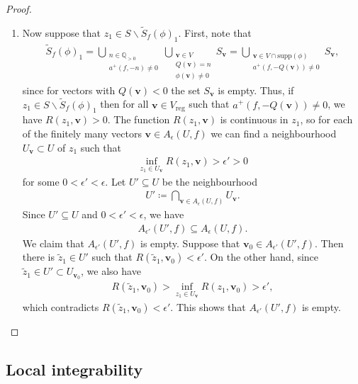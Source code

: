 \documentclass[twoside,a4paper,10pt]{article} %
\newcommand{\8}{\infty}
\newcommand{\vbf}{\mathbf{v}}
\newcommand{\Stil}{\widetilde{S}}
\newcommand{\Q}{\mathbb{Q}}
\newcommand{\reg}{\mathrm{reg}}
\newcommand{\supp}{\mathrm{supp}}
\theoremstyle{mytheoremstyle}
\theoremstyle{remark}
\numberwithin{equation}{section}
\begin{document}
\begin{proof}
\begin{enumerate}
\item Now suppose that $z_1 \in S \smallsetminus \Stil_f(\phi)_1$. First, note that
\begin{align}
\Stil_f(\phi)_1 = \bigcup_{\substack{ n \in \Q_{>0} \\ a^+(f,-n) \neq 0}} \bigcup_{\substack{ \vbf \in  V \\ Q(\vbf)=n \\ \phi (\vbf) \neq 0}} S_\vbf = \bigcup_{\substack{ \vbf \in V \cap \supp(\phi) \\ a^+(f,-Q(\vbf)) \neq 0}} S_\vbf,
\end{align}
since for vectors with $Q(\vbf)<0$ the set $S_\vbf$ is empty.  Thus, if $z_1 \in S \smallsetminus \Stil_f(\phi)_1$ then for all $\vbf \in V_\reg$ such that $a^+(f,-Q(\vbf)) \neq 0$, we have $R(z_1,\vbf)>0$. The function $R(z_1,\vbf)$ is continuous in $z_1$, so for each of the finitely many vectors $\vbf \in A_\epsilon(U,f)$ we can find a neighbourhood $U_\vbf \subset U$ of $z_1$ such that 
\begin{align}
\inf_{z_1 \in U_\vbf} R(z_1,\vbf)> \epsilon'>0
\end{align}
for some $0<\epsilon' <\epsilon$. Let $U' \subseteq U$ be the neighbourhood
\begin{align}
U' \coloneqq \bigcap_{\vbf \in A_\epsilon(U,f)} U_\vbf.
\end{align}  Since $U' \subseteq U$ and $0<\epsilon' <\epsilon$, we have
\begin{align}
A_{\epsilon'}(U',f) \subseteq A_\epsilon(U,f).
\end{align}
We claim that $A_{\epsilon'}(U',f)$ is empty. Suppose that $\vbf_0 \in A_{\epsilon'}(U',f)$. Then there is $\tilde{z}_1 \in U'$ such that $R(\tilde{z}_1,\vbf_0)<\epsilon'$. On the other hand, since $\tilde{z}_1 \in U' \subset U_{\vbf_0}$, we also have
\begin{align}
R(\tilde{z}_1,\vbf_0)>\inf_{z_1 \in U_\vbf} R(z_1,\vbf_0)> \epsilon',
\end{align}
which contradicts $R(\tilde{z}_1,\vbf_0)<\epsilon'$. This shows that $A_{\epsilon'}(U',f)$ is empty.
\end{enumerate}
\end{proof}













\subsection{Local integrability}
\end{document}
